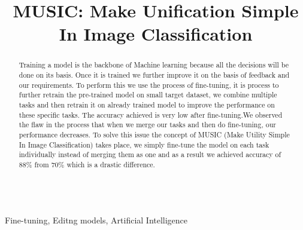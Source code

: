 \documentclass[conference]{IEEEtran}
\begin{document}
\title{MUSIC: Make Unification Simple In Image Classification \\}

\author{
\and
{}
\and
{}
\and
{}
}


\maketitle

\begin{abstract}
Training a model is the backbone of Machine learning because all the decisions will be done on its basis. Once it is trained we further improve it on the basis of feedback and our requirements. To perform this we use the process of fine-tuning, it is process to further retrain the pre-trained model on small target dataset, we combine multiple tasks and then retrain it on already trained model to improve the performance on these specific tasks. The accuracy achieved is very low after fine-tuning.We observed the flaw in the process that when we merge our tasks and then do fine-tuning, our performance decreases. To solve this issue the concept of MUSIC (Make Utility Simple In Image Classification) takes place, we simply fine-tune the model on each task individually instead of merging them as one and as a result we achieved accuracy of 88\% from 70\% which is a drastic difference. 
\end{abstract}

\begin{IEEEkeywords}
\vspace{0.5cm} \\ Fine-tuning, Editng models, Artificial Intelligence
\end{IEEEkeywords}
\end{document}
